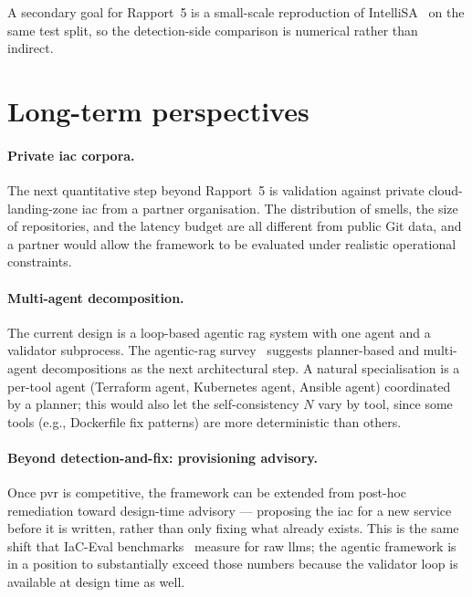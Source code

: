\documentclass[12pt, a4paper]{report}
\begin{document}
A secondary goal for Rapport~5 is a small-scale reproduction of
IntelliSA~\citep{intellisa2026} on the same test split, so the
detection-side comparison is numerical rather than indirect.

\section{Long-term perspectives}

\paragraph{Private \gls{iac} corpora.}
The next quantitative step beyond Rapport~5 is validation against
private cloud-landing-zone \gls{iac} from a partner organisation. The
distribution of smells, the size of repositories, and the latency
budget are all different from public Git data, and a partner would
allow the framework to be evaluated under realistic operational
constraints.

\paragraph{Multi-agent decomposition.}
The current design is a loop-based agentic \gls{rag} system with one
agent and a validator subprocess. The agentic-\gls{rag}
survey~\citep{agenticrag2025survey} suggests planner-based and
multi-agent decompositions as the next architectural step. A natural
specialisation is a per-tool agent (Terraform agent, Kubernetes agent,
Ansible agent) coordinated by a planner; this would also let the
self-consistency $N$ vary by tool, since some tools (e.g.,
Dockerfile fix patterns) are more deterministic than others.

\paragraph{Beyond detection-and-fix: provisioning advisory.}
Once \gls{pvr} is competitive, the framework can be extended from
post-hoc remediation toward design-time advisory --- proposing the
\gls{iac} for a new service before it is written, rather than only
fixing what already exists. This is the same shift that IaC-Eval
benchmarks~\citep{kon2024iaceval} measure for raw
\glspl{llm}; the agentic framework is in a position to substantially
exceed those numbers because the validator loop is available at design
time as well.


\end{document}

